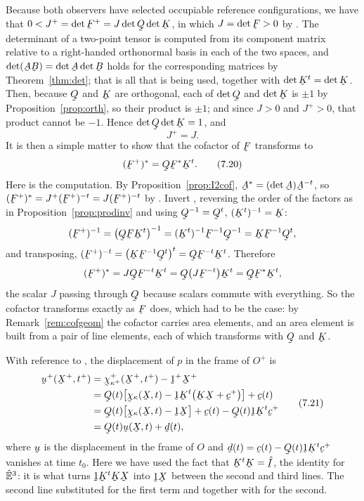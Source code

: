 Because both observers have selected occupiable reference
configurations, we have that
$0<J^{+}=\det\bF^{+}=J\det\bQ\det\bK$, in which $J=\det\bF>0$ by
. The determinant of a two-point tensor is computed from its
component matrix relative to a right-handed orthonormal basis in each of
the two spaces, and $\det(\bA\bB)=\det\bA\det\bB$ holds for the
corresponding matrices by Theorem~\ref{thm:det}; that is all that is
being used, together with $\det\bK^{t}=\det\bK$. Then, because $\bQ$ and
$\bK$ are orthogonal, each of $\det\bQ$ and $\det\bK$ is $\pm1$ by
Proposition~\ref{prop:orth}, so their product is $\pm1$; and since
$J>0$ and $J^{+}>0$, that product cannot be $-1$. Hence
$\det\bQ\det\bK=1$, and
\begin{equation}
   J^{+}=J.
   \tag{7.19}\label{eq:7.19}
\end{equation}
It is then a simple matter to show that the cofactor of $\bF$ transforms
to
\begin{equation}
   (\bF^{+})^{*}=\bQ\bF^{*}\bK^{t}.
   \tag{7.20}\label{eq:7.20}
\end{equation}
Here is the computation. By Proposition~\ref{prop:I2cof},
$\bA^{*}=(\det\bA)\bA^{-t}$, so $(\bF^{+})^{*}=J^{+}(\bF^{+})^{-t}
=J(\bF^{+})^{-t}$ by . Invert , reversing the order
of the factors as in Proposition~\ref{prop:prodinv} and using
$\bQ^{-1}=\bQ^{t}$, $(\bK^{t})^{-1}=\bK$:
\[
   (\bF^{+})^{-1}=\big(\bQ\bF\bK^{t}\big)^{-1}
   =(\bK^{t})^{-1}\bF^{-1}\bQ^{-1}=\bK\bF^{-1}\bQ^{t},
\]
and transposing,
$(\bF^{+})^{-t}=\big(\bK\bF^{-1}\bQ^{t}\big)^{t}
=\bQ\bF^{-t}\bK^{t}$. Therefore
\[
   (\bF^{+})^{*}=J\bQ\bF^{-t}\bK^{t}=\bQ\big(J\bF^{-t}\big)\bK^{t}
   =\bQ\bF^{*}\bK^{t},
\]
the scalar $J$ passing through $\bQ$ because scalars commute with
everything. So the cofactor transforms exactly as $\bF$ does, which had
to be the case: by Remark~\ref{rem:cofgeom} the cofactor carries area
elements, and an area element is built from a pair of line elements, each
of which transforms with $\bQ$ and $\bK$.

With reference to , the displacement of $p$ in the frame of
$O^{+}$ is
\begin{equation}
\begin{aligned}
   \bu^{+}(\bX^{+},t^{+})
   &=\bchi^{+}_{\kappa^{+}}(\bX^{+},t^{+})-\shift^{+}\bX^{+}\\
   &=\bQ(t)\big[\bchi_{\kappa}(\bX,t)
     -\shift\bK^{t}\big(\bK\bX+\bc^{+}\big)\big]+\bc(t)\\
   &=\bQ(t)\big[\bchi_{\kappa}(\bX,t)-\shift\bX\big]+\bc(t)
     -\bQ(t)\shift\bK^{t}\bc^{+}\\
   &=\bQ(t)\bu(\bX,t)+\bd(t),
\end{aligned}
   \tag{7.21}\label{eq:7.21}
\end{equation}
where $\bu$ is the displacement in the frame of $O$ and
$\bd(t)=\bc(t)-\bQ(t)\shift\bK^{t}\bc^{+}$ vanishes at time $t_{0}$.
Here we have used the fact that $\bK^{t}\bK=\hI$, the identity for
$\hat{\mathbb{E}}^{3}$: it is what turns $\shift\bK^{t}\bK\bX$ into $\shift\bX$ between
the second and third lines. The second line substituted  for
the first term and  together with  for the second.

